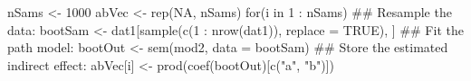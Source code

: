 \begin{Schunk}
\begin{Sinput}
 nSams <- 1000
 abVec <- rep(NA, nSams)
 for(i in 1 : nSams) {
     ## Resample the data:
     bootSam <- 
         dat1[sample(c(1 : nrow(dat1)), replace = TRUE), ]
     ## Fit the path model:
     bootOut <- sem(mod2, data = bootSam)
     ## Store the estimated indirect effect:
     abVec[i] <- prod(coef(bootOut)[c("a", "b")])
 }
\end{Sinput}
\end{Schunk}
